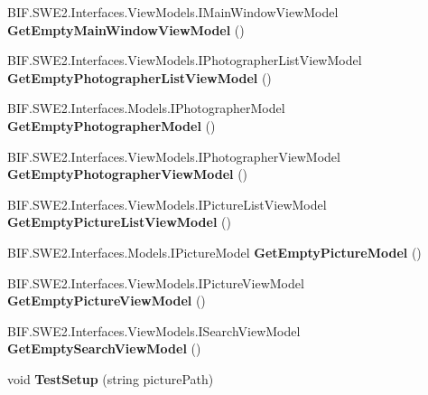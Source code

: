\begin{DoxyCompactItemize}
B\+I\+F.\+S\+W\+E2.\+Interfaces.\+View\+Models.\+I\+Main\+Window\+View\+Model {\bfseries Get\+Empty\+Main\+Window\+View\+Model} ()
\item 
\mbox{\label{class_uebungen_1_1_u_e_b1_aeebb3377800b3909b6825c2f43098764}} 
B\+I\+F.\+S\+W\+E2.\+Interfaces.\+View\+Models.\+I\+Photographer\+List\+View\+Model {\bfseries Get\+Empty\+Photographer\+List\+View\+Model} ()
\item 
\mbox{\label{class_uebungen_1_1_u_e_b1_aec3b73703d90b9eae56b2179137181ab}} 
B\+I\+F.\+S\+W\+E2.\+Interfaces.\+Models.\+I\+Photographer\+Model {\bfseries Get\+Empty\+Photographer\+Model} ()
\item 
\mbox{\label{class_uebungen_1_1_u_e_b1_a7d8293691705450f411a31a2be771ae5}} 
B\+I\+F.\+S\+W\+E2.\+Interfaces.\+View\+Models.\+I\+Photographer\+View\+Model {\bfseries Get\+Empty\+Photographer\+View\+Model} ()
\item 
\mbox{\label{class_uebungen_1_1_u_e_b1_a28ba60ed419d108e3b489a27ee7f3449}} 
B\+I\+F.\+S\+W\+E2.\+Interfaces.\+View\+Models.\+I\+Picture\+List\+View\+Model {\bfseries Get\+Empty\+Picture\+List\+View\+Model} ()
\item 
\mbox{\label{class_uebungen_1_1_u_e_b1_a2b72b174697a0c16e44a8652f923365f}} 
B\+I\+F.\+S\+W\+E2.\+Interfaces.\+Models.\+I\+Picture\+Model {\bfseries Get\+Empty\+Picture\+Model} ()
\item 
\mbox{\label{class_uebungen_1_1_u_e_b1_a710930a678c2607f5f55347b551253b9}} 
B\+I\+F.\+S\+W\+E2.\+Interfaces.\+View\+Models.\+I\+Picture\+View\+Model {\bfseries Get\+Empty\+Picture\+View\+Model} ()
\item 
\mbox{\label{class_uebungen_1_1_u_e_b1_acfe5069c77d36dbcbd3b24785b41bb6b}} 
B\+I\+F.\+S\+W\+E2.\+Interfaces.\+View\+Models.\+I\+Search\+View\+Model {\bfseries Get\+Empty\+Search\+View\+Model} ()
\item 
\mbox{\label{class_uebungen_1_1_u_e_b1_a71a3f72b24b518c711f0645b3b810452}} 
void {\bfseries Test\+Setup} (string picture\+Path)

\end{DoxyCompactItemize}
